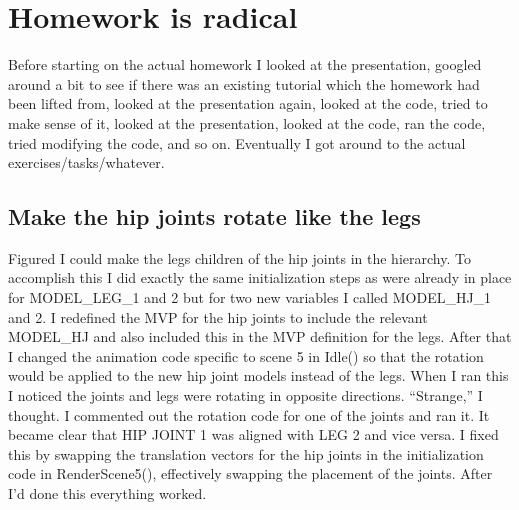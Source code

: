 \section{Homework is radical}
Before starting on the actual homework I looked at the presentation, googled around a bit to see if there was an existing tutorial which the homework had been lifted from, looked at the presentation again, looked at the code, tried to make sense of it, looked at the presentation, looked at the code, ran the code, tried modifying the code, and so on.
Eventually I got around to the actual exercises/tasks/whatever.

\subsection{Make the hip joints rotate like the legs}
Figured I could make the legs children of the hip joints in the hierarchy.
To accomplish this I did exactly the same initialization steps as were already in place for MODEL\_LEG\_1 and 2 but for two new variables I called MODEL\_HJ\_1 and 2.
I redefined the MVP for the hip joints to include the relevant MODEL\_HJ and also included this in the MVP definition for the legs.
After that I changed the animation code specific to scene 5 in Idle() so that the rotation would be applied to the new hip joint models instead of the legs.
When I ran this I noticed the joints and legs were rotating in opposite directions.
``Strange,'' I thought.
I commented out the rotation code for one of the joints and ran it.
It became clear that HIP JOINT 1 was aligned with LEG 2 and vice versa.
I fixed this by swapping the translation vectors for the hip joints in the initialization code in RenderScene5(), effectively swapping the placement of the joints.
After I'd done this everything worked.
